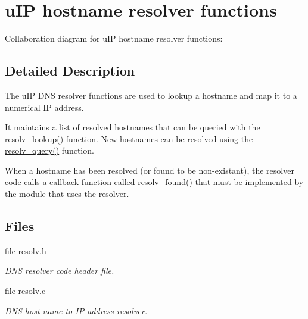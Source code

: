 \hypertarget{a00083}{
\section{u\-IP hostname resolver functions}
\label{a00083}
}


Collaboration diagram for u\-IP hostname resolver functions:

\subsection{Detailed Description}
The u\-IP DNS resolver functions are used to lookup a hostname and map it to a numerical IP address. 

It maintains a list of resolved hostnames that can be queried with the \hyperlink{a00083_g66d19181ad5fe8b8f7c84d1f1d46a2ec}{resolv\_\-lookup()} function. New hostnames can be resolved using the \hyperlink{a00083_ge4dcbbe6c641d2e3b8537b479df5fc99}{resolv\_\-query()} function.

When a hostname has been resolved (or found to be non-existant), the resolver code calls a callback function called \hyperlink{a00083_g6d9751d534453425c7a5a215d1d4414c}{resolv\_\-found()} that must be implemented by the module that uses the resolver. 

\subsection*{Files}
\begin{CompactItemize}
\item 
file \hyperlink{a00040}{resolv.h}
\begin{CompactList}\small\item\em DNS resolver code header file. \item\end{CompactList}

\item 
file \hyperlink{a00039}{resolv.c}
\begin{CompactList}\small\item\em DNS host name to IP address resolver. \item\end{CompactList}

\end{CompactItemize}
